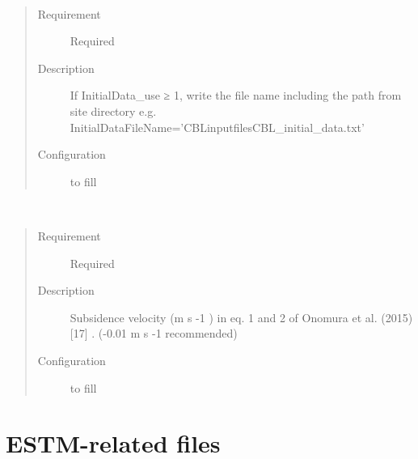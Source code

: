 \documentclass[letterpaper,10pt,english]{sphinxmanual}
\begin{document}
\begin{fulllineitems}
\label{\detokenize{input_files/CBL_input/CBLinput:cmdoption-arg-initialdatafilename}}~\begin{quote}\begin{description}
\item[{Requirement}] \leavevmode
Required

\item[{Description}] \leavevmode
If InitialData\_use ≥ 1, write the file name including the path from site directory e.g. InitialDataFileName=’CBLinputfilesCBL\_initial\_data.txt’

\item[{Configuration}] \leavevmode
to fill

\end{description}\end{quote}

\end{fulllineitems}


\begin{fulllineitems}
\label{\detokenize{input_files/CBL_input/CBLinput:cmdoption-arg-wsb}}~\begin{quote}\begin{description}
\item[{Requirement}] \leavevmode
Required

\item[{Description}] \leavevmode
Subsidence velocity (m s -1 ) in eq. 1 and 2 of Onomura et al. (2015) {[}17{]} . (-0.01 m s -1 recommended)

\item[{Configuration}] \leavevmode
to fill

\end{description}\end{quote}

\end{fulllineitems}



\section{ESTM-related files}
\label{\detokenize{input_files/ESTM_related_files/ESTM_related_files:estm-related-files}}\label{\detokenize{input_files/ESTM_related_files/ESTM_related_files::doc}}
\end{document}
